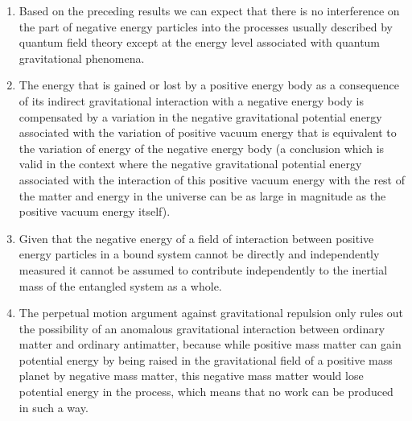 \documentclass[notitlepage,12pt]{report}
\begin{document}
\begin{enumerate}
\item Based on the preceding results we can expect that there is no interference on the part of negative energy particles into the processes usually described by quantum field theory except at the energy level associated with quantum gravitational phenomena.

\item The energy that is gained or lost by a positive energy body as a consequence of its indirect gravitational interaction with a negative energy body is compensated by a variation in the negative gravitational potential energy associated with the variation of positive vacuum energy that is equivalent to the variation of energy of the negative energy body (a conclusion which is valid in the context where the negative gravitational potential energy associated with the interaction of this positive vacuum energy with the rest of the matter and energy in the universe can be as large in magnitude as the positive vacuum energy itself).

\item Given that the negative energy of a field of interaction between positive energy particles in a bound system cannot be directly and independently measured it cannot be assumed to contribute independently to the inertial mass of the entangled system as a whole.

\item The perpetual motion argument against gravitational repulsion only rules out the possibility of an anomalous gravitational interaction between ordinary matter and ordinary antimatter, because while positive mass matter can gain potential energy by being raised in the gravitational field of a positive mass planet by negative mass matter, this negative mass matter would lose potential energy in the process, which means that no work can be produced in such a way.


\end{enumerate}
\end{document}
